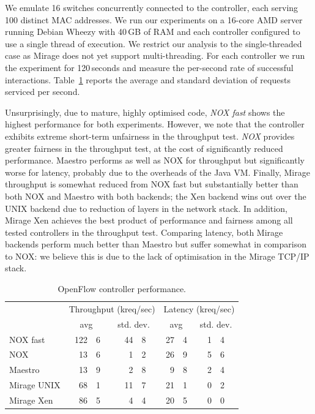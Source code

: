 We emulate 16 switches concurrently connected to the controller, each serving
100 distinct MAC addresses. We run our experiments on a 16-core AMD server
running Debian Wheezy with 40\,GB of RAM and each controller configured to use
a single thread of execution. We restrict our analysis to the single-threaded
case as Mirage does not yet support multi-threading. For each controller we
run the experiment for 120\,seconds and measure the per-second rate of
successful interactions. Table~\ref{tbl:controller} reports the average and
standard deviation of requests serviced per second.

Unsurprisingly, due to mature, highly optimised code, \emph{NOX fast} shows
the highest performance for both experiments. However, we note that the
controller exhibits extreme short-term unfairness in the throughput test.
\emph{NOX} provides greater fairness in the throughput test, at the cost of
significantly reduced performance. Maestro performs as well as NOX for
throughput but significantly worse for latency, probably due to the overheads
of the Java VM. Finally, Mirage throughput is somewhat reduced from NOX fast
but substantially better than both NOX and Maestro with both backends; the Xen
backend wins out over the UNIX backend due to reduction of layers in the
network stack. In addition, Mirage Xen achieves the best product of
performance and fairness among all tested controllers in the throughput test.
Comparing latency, both Mirage backends perform much better than Maestro but
suffer somewhat in comparison to NOX: we believe this is due to the lack of
optimisation in the Mirage TCP/IP stack.

\begin{table}\small
\newcommand\T{\rule{0pt}{2.6ex}}
\newcommand\B{\rule[-1.2ex]{0pt}{0pt}}
\centering
\begin{tabular} { l | r@{.}l r@{.}l | r@{.}l r@{.}l }
\hline
\T \multirow{2}{*}{Controller} 
   & \multicolumn{4}{c|}{Throughput (kreq/sec)}  
   & \multicolumn{4}{c}{Latency (kreq/sec)} \\
\B & \multicolumn{2}{c}{avg} & \multicolumn{2}{c|}{std. dev.} 
   & \multicolumn{2}{c}{avg} & \multicolumn{2}{c}{std. dev.} \\
\hline
\T NOX fast   & 122&6 & \quad{} 44&8 & 27&4 & \quad{} 1&4 \\
NOX           &  13&6 &  1&2 & 26&9 & 5&6 \\
Maestro       &  13&9 &  2&8 &  9&8 & 2&4 \\
Mirage UNIX   &  68&1 & 11&7 & 21&1 & 0&2 \\
\B Mirage Xen &  86&5 &  4&4 & 20&5 & 0&0 \\
\hline
\end{tabular}
\caption{\label{tbl:controller}OpenFlow controller performance.}
\end{table}

